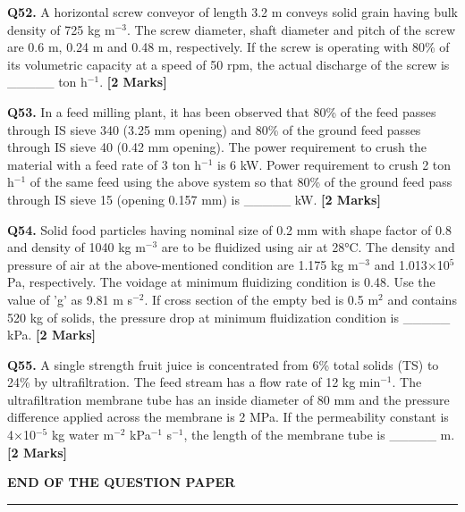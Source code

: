 \documentclass[11pt]{article}
\newcommand{\questionb}[2]{
    \noindent\textbf{Q#2.} #1 \hfill \textbf{[2 Marks]}
}
\begin{document}
\questionb{A horizontal screw conveyor of length 3.2 m conveys solid grain having bulk density of 725 kg m\(^{-3}\). The screw diameter, shaft diameter and pitch of the screw are 0.6 m, 0.24 m and 0.48 m, respectively. If the screw is operating with 80\% of its volumetric capacity at a speed of 50 rpm, the actual discharge of the screw is \_\_\_\_\_ ton h\(^{-1}\).}{52}
\vspace{0.5cm}

\questionb{In a feed milling plant, it has been observed that 80\% of the feed passes through IS sieve 340 (3.25 mm opening) and 80\% of the ground feed passes through IS sieve 40 (0.42 mm opening). The power requirement to crush the material with a feed rate of 3 ton h\(^{-1}\) is 6 kW. Power requirement to crush 2 ton h\(^{-1}\) of the same feed using the above system so that 80\% of the ground feed pass through IS sieve 15 (opening 0.157 mm) is \_\_\_\_\_ kW.}{53}
\vspace{0.5cm}

\questionb{Solid food particles having nominal size of 0.2 mm with shape factor of 0.8 and density of 1040 kg m\(^{-3}\) are to be fluidized using air at 28°C. The density and pressure of air at the above-mentioned condition are 1.175 kg m\(^{-3}\) and 1.013×10\(^5\) Pa, respectively. The voidage at minimum fluidizing condition is 0.48. Use the value of 'g' as 9.81 m s\(^{-2}\). If cross section of the empty bed is 0.5 m\(^2\) and contains 520 kg of solids, the pressure drop at minimum fluidization condition is \_\_\_\_\_ kPa.}{54}
\vspace{0.5cm}

\questionb{A single strength fruit juice is concentrated from 6\% total solids (TS) to 24\% by ultrafiltration. The feed stream has a flow rate of 12 kg min\(^{-1}\). The ultrafiltration membrane tube has an inside diameter of 80 mm and the pressure difference applied across the membrane is 2 MPa. If the permeability constant is 4×10\(^{-5}\) kg water m\(^{-2}\) kPa\(^{-1}\) s\(^{-1}\), the length of the membrane tube is \_\_\_\_\_ m.}{55}
\vspace{0.5cm}

\begin{center}
\textbf{END OF THE QUESTION PAPER}
\rule{\textwidth}{0.5pt} 
\end{center}
\end{document}
